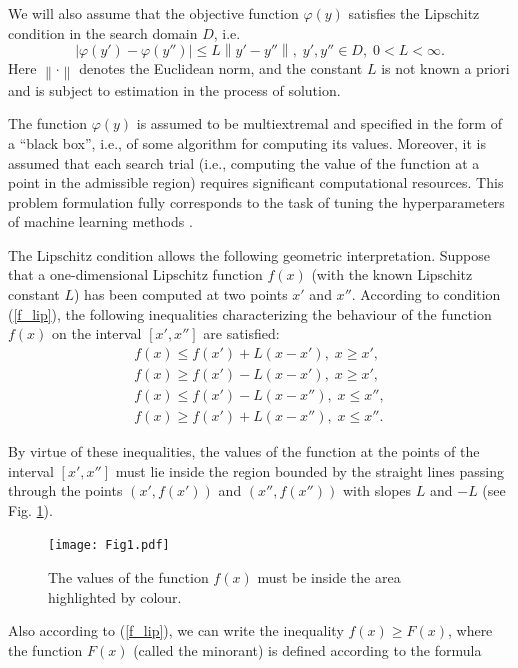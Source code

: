 \documentclass[preprint,12pt]{elsarticle}
\begin{document}
We will also assume that the objective function $\varphi(y)$ satisfies the Lipschitz condition in the search domain $D$, i.e.
\begin{equation} \label{f_lip}
	\left| \varphi(y')-\varphi(y'') \right| \leq L\left\| y' - y''  \right\| , \; y',y'' \in D, \; 0<L<\infty.
\end{equation}
Here $ \left\| \cdot \right\|$ denotes the Euclidean norm, and the constant $L$ is not known a priori and is subject to estimation in the process of solution. 

The function $\varphi(y)$ is assumed to be multiextremal and specified in the form of a ``black box'', i.e., of some algorithm for computing its values. Moreover, it is assumed that each search trial (i.e., computing the value of the function at a point in the admissible region) requires significant computational resources. This problem formulation fully corresponds to the task of tuning the hyperparameters of machine learning methods \cite{Joy2020,Wang2021}.


The Lipschitz condition allows the following geometric interpretation. Suppose that a one-dimensional Lipschitz function $f(x)$ (with the known Lipschitz constant $L$) has been computed at two points $x'$ and $x''$. According to condition (\ref{f_lip}), the following inequalities characterizing the behaviour of the function $f(x)$ on the interval $[x', x'']$  are satisfied:
\begin{gather*}
	f(x) \leq f(x') + L(x-x'), \; x \geq x',\\
	f(x) \geq f(x') - L(x-x'), \; x \geq x',\\
	f(x) \leq f(x') - L(x-x''), \; x \leq x'',\\
	f(x) \geq f(x') + L(x-x''), \; x \leq x''.
\end{gather*}

  By virtue of these inequalities, the values of the function at the points of the interval $[x', x'']$ must lie inside the region bounded by the straight lines passing through the points $(x', f(x'))$ and $(x'', f(x''))$ with slopes $L$ and $-L$ (see Fig. \ref{fig1}).

\begin{figure}
\centering
\texttt{[image: Fig1.pdf]}
\caption{The values of the function $f(x)$ must be inside the area highlighted by colour.} \label{fig1}
\end{figure}

Also according to (\ref{f_lip}), we can write the inequality $f(x) \geq F(x)$, where the function  $F(x)$ (called the minorant) is defined according to the formula
\end{document}
